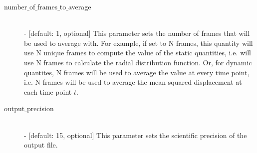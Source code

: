 \documentclass{article}
\begin{document}
\begin{description}
	\item[number$\_$of$\_$frames$\_$to$\_$average] \hfill \\
	- [default: 1, optional] This parameter sets the number of frames that will be used to average with.  For example, if set to N frames, this quantity will use N unique frames to compute the value of the static quantities, i.e. will use N frames to calculate the radial distribution function.  Or, for dynamic quantites, N frames will be used to average the value at every time point, i.e. N frames will be used to average the mean squared displacement at each time point $t$.
	
	\item[output$\_$precision] \hfill \\
	- [default: 15, optional] This parameter sets the scientific precision of the output file.
	
	
\end{description}
\end{document}
